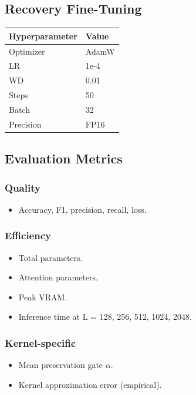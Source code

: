 \subsection{Recovery Fine-Tuning}

\begin{table}[H]
\centering
\small
\begin{tabular}{ll}
\toprule
\textbf{Hyperparameter} & \textbf{Value} \\
\midrule
Optimizer & AdamW \\
LR & 1e-4 \\
WD & 0.01 \\
Steps & 50 \\
Batch & 32 \\
Precision & FP16 \\
\bottomrule
\end{tabular}
\end{table}

\subsection{Evaluation Metrics}

\subsubsection{Quality}
\begin{itemize}
\item Accuracy, F1, precision, recall, loss.

\end{itemize}
\subsubsection{Efficiency}
\begin{itemize}
\item Total parameters.
\item Attention parameters.
\item Peak VRAM.
\item Inference time at L = 128, 256, 512, 1024, 2048.

\end{itemize}
\subsubsection{Kernel-specific}
\begin{itemize}
\item Mean preservation gate $\alpha$.
\item Kernel approximation error (empirical).

\end{itemize}
